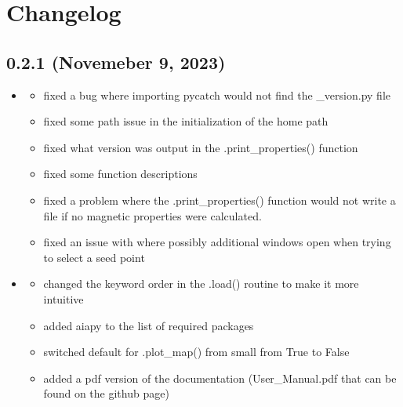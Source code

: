 \documentclass[letterpaper,10pt,english]{sphinxmanual}
\begin{document}
\sphinxstepscope


\chapter{Changelog}
\label{\detokenize{changelog:changelog}}\label{\detokenize{changelog::doc}}

\section{0.2.1 (Novemeber 9, 2023)}
\label{\detokenize{changelog:novemeber-9-2023}}\begin{itemize}
\item {} \begin{description}
\begin{itemize}
\item {} 
\sphinxAtStartPar
fixed a bug where importing pycatch would not find the \_version.py file

\item {} 
\sphinxAtStartPar
fixed some path issue in the initialization of the home path

\item {} 
\sphinxAtStartPar
fixed what version was output in the .print\_properties() function

\item {} 
\sphinxAtStartPar
fixed some function descriptions

\item {} 
\sphinxAtStartPar
fixed a problem where the .print\_properties() function would not write a file if no magnetic properties were calculated.

\item {} 
\sphinxAtStartPar
fixed an issue with where possibly additional windows open when trying to select a seed point

\end{itemize}

\end{description}

\item {} \begin{description}
\begin{itemize}
\item {} 
\sphinxAtStartPar
changed the keyword order in the  .load()  routine to make it more intuitive

\item {} 
\sphinxAtStartPar
added aiapy to the list of required packages

\item {} 
\sphinxAtStartPar
switched default for .plot\_map() from small from True to False

\item {} 
\sphinxAtStartPar
added a pdf version of the documentation (User\_Manual.pdf that can be found on the github page)

\end{itemize}

\end{description}

\end{itemize}
\end{document}
